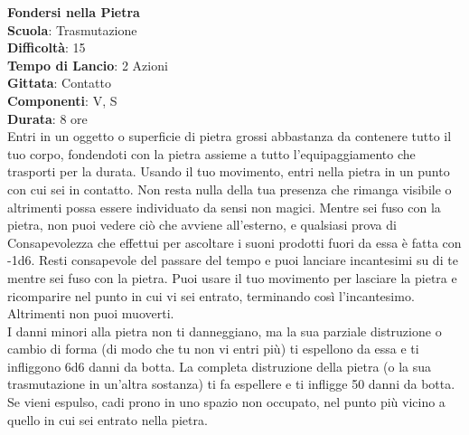 \begin{multicols}{2}
\medskip\textbf{Fondersi nella Pietra}\\
\textbf{Scuola}: Trasmutazione\\
\textbf{Difficoltà}: 15\\
\textbf{Tempo di Lancio}: 2 Azioni\\
\textbf{Gittata}: Contatto\\
\textbf{Componenti}: V, S\\
\textbf{Durata}: 8 ore\\
Entri in un oggetto o superficie di pietra grossi abbastanza da contenere tutto il tuo corpo, fondendoti con la pietra assieme a tutto l'equipaggiamento che trasporti per la durata. Usando il tuo movimento, entri nella pietra in un punto con cui sei in contatto. Non resta nulla della tua presenza che rimanga visibile o altrimenti possa essere individuato da sensi non magici. Mentre sei fuso con la pietra, non puoi vedere ciò che avviene all'esterno, e qualsiasi prova di Consapevolezza che effettui per ascoltare i suoni prodotti fuori da essa è fatta con -1d6. Resti consapevole del passare del tempo e puoi lanciare incantesimi su di te mentre sei fuso con la pietra. Puoi usare il tuo movimento per lasciare la pietra e ricomparire nel punto in cui vi sei entrato, terminando così l'incantesimo. Altrimenti non puoi muoverti.\\
I danni minori alla pietra non ti danneggiano, ma la sua parziale distruzione o cambio di forma (di modo che tu non vi entri più) ti espellono da essa e ti infliggono 6d6 danni da botta. La completa distruzione della pietra (o la sua trasmutazione in un'altra sostanza) ti fa espellere e ti infligge 50 danni da botta. Se vieni espulso, cadi prono in uno spazio non occupato, nel punto più vicino a quello in cui sei entrato nella pietra.


\end{multicols}
